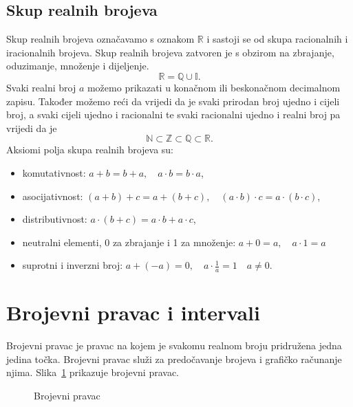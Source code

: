 \subsection{Skup realnih brojeva}\label{subsec:skup-realnih-brojeva}
Skup realnih brojeva označavamo s oznakom $\mathbb{R}$ i sastoji se od skupa racionalnih i iracionalnih brojeva.
Skup realnih brojeva zatvoren je s obzirom na zbrajanje, oduzimanje, množenje i dijeljenje.
\[ \mathbb{R}=\mathbb{Q} \cup \mathbb{I}. \]
Svaki realni broj $a$ možemo prikazati u konačnom ili beskonačnom decimalnom zapisu.
Također možemo reći da vrijedi da je svaki prirodan broj ujedno i cijeli broj, a svaki cijeli ujedno i racionalni te svaki racionalni ujedno i realni broj pa vrijedi da je
\[ \mathbb{N} \subset \mathbb{Z} \subset \mathbb{Q} \subset \mathbb{R}. \]
Aksiomi polja skupa realnih brojeva su:
\begin{itemize}
  \item komutativnost: $a+b=b+a, \quad a \cdot b = b \cdot a$,
  \item asocijativnost: $(a+b)+c=a+(b+c), \quad (a \cdot b) \cdot c = a \cdot (b \cdot c)$,
  \item distributivnost: $a \cdot (b + c) = a \cdot b + a \cdot c$,
  \item neutralni elementi, 0 za zbrajanje i 1 za množenje: $a + 0 = a, \quad a \cdot 1 = a$
  \item suprotni i inverzni broj: $\displaystyle a + (-a) = 0, \quad a \cdot \frac{1}{a} = 1 \quad a \neq 0.$
\end{itemize}

\section{Brojevni pravac i intervali}\label{sec:brojevni-pravac-i-intervali}
Brojevni pravac je pravac na kojem je svakomu realnom broju pridružena jedna jedina točka.
Brojevni pravac služi za predočavanje brojeva i grafičko računanje njima.
Slika~\ref{fig:brojevni-pravac} prikazuje brojevni pravac.

\begin{figure}[h!]
\begin{center}\vspace{0.25cm}
\end{center}
\caption{Brojevni pravac}\label{fig:brojevni-pravac}
\end{figure}

